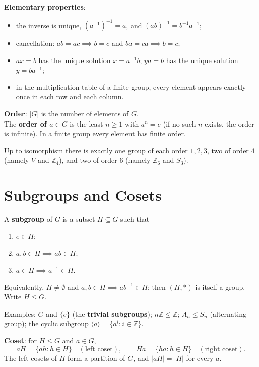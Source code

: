\documentclass[12pt, a4paper, UTF8, openany]{ctexbook}
\newcommand{\field}[1]{\mathbb{#1}}%
\begin{document}
        \textbf{Elementary properties}:
        \begin{itemize}
            \item the inverse is unique, $(a^{-1})^{-1} = a$, and $(ab)^{-1} = b^{-1} a^{-1}$;
            \item cancellation: $ab = ac \implies b = c$ and $ba = ca \implies b = c$;
            \item $ax = b$ has the unique solution $x = a^{-1}b$; $ya = b$ has the unique solution $y = ba^{-1}$;
            \item in the multiplication table of a finite group, every element appears exactly once in each row and each column.
        \end{itemize}

        \textbf{Order}: $|G|$ is the number of elements of $G$. \\
        The \textbf{order of $a \in G$} is the least $n \geqslant 1$ with $a^n = e$ (if no such $n$ exists, the order is infinite). In a finite group every element has finite order.

        Up to isomorphism there is exactly one group of each order $1, 2, 3$, two of order $4$ (namely $V$ and $\field{Z}_4$), and two of order $6$ (namely $\field{Z}_6$ and $S_3$).

    \section{Subgroups and Cosets}
        A \textbf{subgroup} of $G$ is a subset $H \subseteq G$ such that
        \begin{enumerate}
            \item $e \in H$;
            \item $a, b \in H \implies ab \in H$;
            \item $a \in H \implies a^{-1} \in H$.
        \end{enumerate}
        Equivalently, $H \neq \emptyset$ and $a, b \in H \implies ab^{-1} \in H$; then $(H, *)$ is itself a group. Write $H \leqslant G$.

        Examples: $G$ and $\{e\}$ (the \textbf{trivial subgroups}); $n\field{Z} \leqslant \field{Z}$; $A_n \leqslant S_n$ (alternating group); the cyclic subgroup $\langle a \rangle = \{a^i : i \in \field{Z}\}$.

        \textbf{Coset}: for $H \leqslant G$ and $a \in G$,
        $$ aH = \{ah : h \in H\} \quad (\text{left coset}), \qquad
           Ha = \{ha : h \in H\} \quad (\text{right coset}). $$
        The left cosets of $H$ form a partition of $G$, and $|aH| = |H|$ for every $a$.
\end{document}
